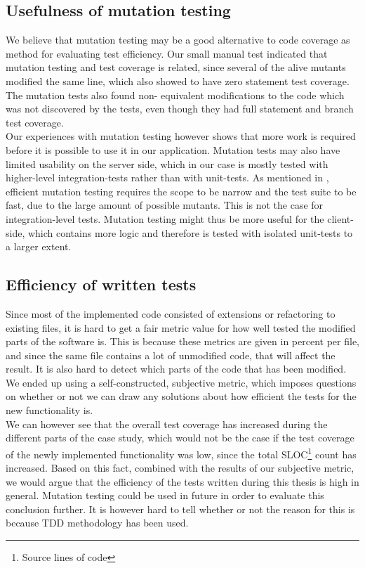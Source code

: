\subsection{Usefulness of mutation testing}

We believe that mutation testing may be a good alternative to code
coverage as method for evaluating test efficiency. Our small manual test
indicated that mutation testing and test coverage is related, since
several of the alive mutants modified the same line, which also showed
to have zero statement test coverage. The mutation tests also found non-
equivalent modifications to the code which was not discovered by the
tests, even though they had full statement and branch test coverage.\\

Our experiences with mutation testing however shows that more work is
required before it is possible to use it in our application. Mutation
tests may also have limited usability on the server side, which in our
case is mostly tested with higher-level integration-tests rather than
with unit-tests. As mentioned in , efficient
mutation testing requires the scope to be narrow and the test suite to
be fast, due to the large amount of possible mutants. This is not the
case for integration-level tests. Mutation testing might thus be more
useful for the client-side, which contains more logic and therefore is
tested with isolated unit-tests to a larger extent.\\


\subsection{Efficiency of written tests}

Since most of the implemented code consisted of extensions or
refactoring to existing files, it is hard to get a fair metric value for
how well tested the modified parts of the software is. This is because
these metrics are given in percent per file, and since the same file
contains a lot of unmodified code, that will affect the result. It is
also hard to detect which parts of the code that has been modified. We
ended up using a self-constructed, subjective metric, which imposes
questions on whether or not we can draw any solutions about how
efficient the tests for the new functionality is.\\

We can however see that the overall test coverage has increased during
the different parts of the case study, which would not be the case if
the test coverage of the newly implemented functionality was low, since
the total SLOC\footnote{Source lines of code} count has increased. Based
on this fact, combined with the results of our subjective metric, we
would argue that the efficiency of the tests written during this thesis
is high in general. Mutation testing could be used in future in order to
evaluate this conclusion further. It is however hard to tell whether or
not the reason for this is because TDD methodology has been used.\\

